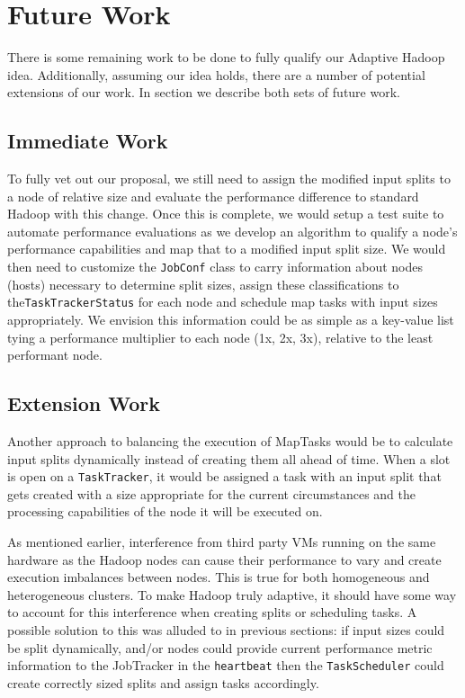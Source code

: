 \section{Future Work}
\label{section:futurework}

There is some remaining work to be done to fully qualify our Adaptive Hadoop idea. Additionally, 
assuming our idea holds, there are a number of potential extensions of our work. In section we
describe both sets of future work.

\subsection{Immediate Work}
To fully vet out our proposal, we still need to assign the modified input splits to a node
of relative size and evaluate the performance difference to standard Hadoop with this change.
Once this is complete, we would setup a test suite to automate performance evaluations as we
develop an algorithm to qualify a node's performance capabilities and map that to a modified
input split size. We would then need to customize the \texttt{JobConf} class to carry
information about nodes (hosts) necessary to determine split sizes, assign these classifications
to the\texttt{TaskTrackerStatus} for each node and schedule map tasks with input sizes
appropriately. We envision this information could be as simple as a key-value list tying
a performance multiplier to each node (1x, 2x, 3x), relative to the least performant node.

\subsection{Extension Work}
Another approach to balancing the execution of MapTasks would be to calculate input splits
dynamically instead of creating them all ahead of time. When a slot is open on a \texttt{TaskTracker}, it would
be assigned a task with an input split that gets created with a size appropriate for the current circumstances
and the processing capabilities of the node it will be executed on.

As mentioned earlier, interference from third party VMs running on the same hardware
as the Hadoop nodes can cause their performance to vary and create execution imbalances
between nodes. This is true for both
homogeneous and heterogeneous clusters. To make Hadoop truly adaptive, it should
have some way to account for this interference when creating splits or scheduling tasks. A possible
solution to this was alluded to in previous sections: if input sizes could be split dynamically, 
and/or nodes could provide current performance metric information to the JobTracker in the
\texttt{heartbeat} then the \texttt{TaskScheduler} could create correctly sized splits and 
assign tasks accordingly.
